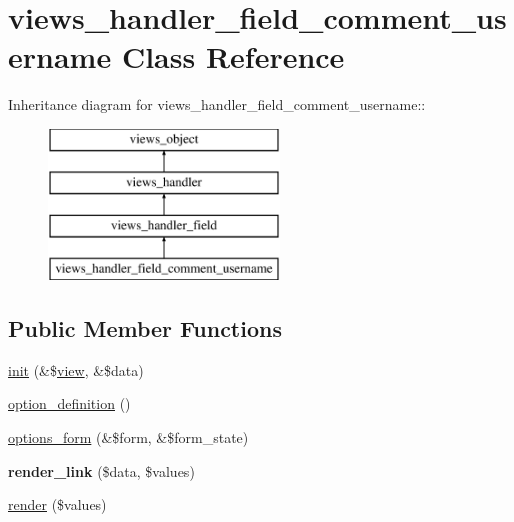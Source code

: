 \hypertarget{classviews__handler__field__comment__username}{
\section{views\_\-handler\_\-field\_\-comment\_\-username Class Reference}
\label{classviews__handler__field__comment__username}
}
Inheritance diagram for views\_\-handler\_\-field\_\-comment\_\-username::\begin{figure}[H]
\begin{center}
\leavevmode
\includegraphics[height=4cm]{classviews__handler__field__comment__username}
\end{center}
\end{figure}
\subsection*{Public Member Functions}
\begin{CompactItemize}
\item 
\hyperlink{classviews__handler__field__comment__username_675e72d8f097a5d645459fab6943bac6}{init} (\&\$\hyperlink{classview}{view}, \&\$data)
\item 
\hyperlink{classviews__handler__field__comment__username_6a9ac27498f1ddce0a8d680d6d33b7c5}{option\_\-definition} ()
\item 
\hyperlink{classviews__handler__field__comment__username_9bcc4bbe9ebbd7247431cfc18c5bab9c}{options\_\-form} (\&\$form, \&\$form\_\-state)
\item 
\hypertarget{classviews__handler__field__comment__username_ad13433240454bc6a94b4c0bda311f78}{
\textbf{render\_\-link} (\$data, \$values)}
\label{classviews__handler__field__comment__username_ad13433240454bc6a94b4c0bda311f78}

\item 
\hyperlink{classviews__handler__field__comment__username_cbef770bc32e839510f616413fd83493}{render} (\$values)
\end{CompactItemize}


